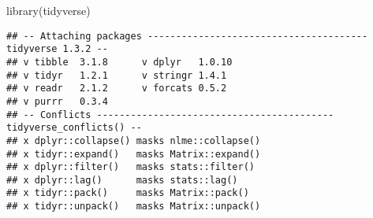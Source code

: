 \documentclass[
]{book}
\newenvironment{Shaded}{\begin{snugshade}}{\end{snugshade}}
\newcommand{\AttributeTok}[1]{\textcolor[rgb]{0.77,0.63,0.00}{#1}}
\newcommand{\ConstantTok}[1]{\textcolor[rgb]{0.00,0.00,0.00}{#1}}
\newcommand{\DecValTok}[1]{\textcolor[rgb]{0.00,0.00,0.81}{#1}}
\newcommand{\FunctionTok}[1]{\textcolor[rgb]{0.00,0.00,0.00}{#1}}
\newcommand{\NormalTok}[1]{#1}
\newcommand{\OtherTok}[1]{\textcolor[rgb]{0.56,0.35,0.01}{#1}}
\newcommand{\SpecialCharTok}[1]{\textcolor[rgb]{0.00,0.00,0.00}{#1}}
\newcommand{\StringTok}[1]{\textcolor[rgb]{0.31,0.60,0.02}{#1}}
\begin{document}
\begin{Shaded}
\begin{Highlighting}[]
\FunctionTok{library}\NormalTok{(tidyverse)}
\end{Highlighting}
\end{Shaded}

\begin{verbatim}
## -- Attaching packages --------------------------------------- tidyverse 1.3.2 --
## v tibble  3.1.8      v dplyr   1.0.10
## v tidyr   1.2.1      v stringr 1.4.1 
## v readr   2.1.2      v forcats 0.5.2 
## v purrr   0.3.4      
## -- Conflicts ------------------------------------------ tidyverse_conflicts() --
## x dplyr::collapse() masks nlme::collapse()
## x tidyr::expand()   masks Matrix::expand()
## x dplyr::filter()   masks stats::filter()
## x dplyr::lag()      masks stats::lag()
## x tidyr::pack()     masks Matrix::pack()
## x tidyr::unpack()   masks Matrix::unpack()
\end{verbatim}

\begin{Shaded}
\end{Shaded}
\end{document}
